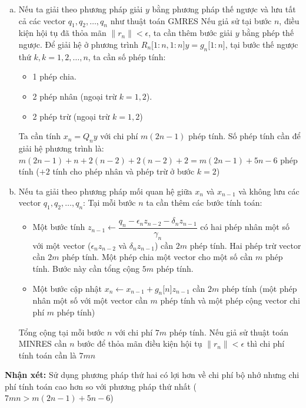 \documentclass[14pt, a4paper]{article}
\numberwithin{equation}{section}
\numberwithin{algorithm}{section}
\numberwithin{figure}{section}
\numberwithin{dl}{section}
\numberwithin{md}{section}
\numberwithin{bd}{section}
\numberwithin{dn}{section}
\begin{document}
\begin{enumerate}[a)] %
    \item Nếu ta giải theo phương pháp giải $y$ bằng phương pháp thế ngược và lưu tất cả các vector $q_1, q_2, \dots, q_n$ như thuật toán GMRES
    Nếu giả sử tại bước $n$, điều kiện hội tụ đã thỏa mãn $\lVert r_n \rVert < \epsilon$, ta cần thêm bước giải $y$ bằng phép thế ngược. Để giải hệ ở phương trình $R_n \lbrack 1:n, 1:n \rbrack y = g_n \lbrack 1:n \rbrack$, tại bước thế ngược thứ $k, k=1,2,\dots,n$, ta cần số phép tính:
    \begin{itemize}
        \item 1 phép chia.
        \item 2 phép nhân (ngoại trừ $k=1,2$).
        \item 2 phép trừ (ngoại trừ $k=1,2$)
    \end{itemize}
    Ta cần tính $x_n = Q_n y$ với chi phí $m(2n-1)$ phép tính.
    Số phép tính cần để giải hệ phương trình là: $m(2n-1) + n + 2(n-2) + 2(n-2) + 2=m(2n-1) + 5n-6$ phép tính ($+2$ tính cho phép nhân và phép trừ ở bước $k=2$)
    \item Nếu ta giải theo phương pháp mối quan hệ giữa $x_n$ và $x_{n-1}$ và không lưu các vector $q_1, q_2, \dots, q_n$:
    Tại mỗi bước $n$ ta cần thêm các bước tính toán:
    \begin{itemize}
        \item Một bước tính $z_{n-1} \leftarrow \dfrac{q_n - \epsilon_n z_{n-2} - \delta_n z_{n-1}}{\gamma_n}$ có hai phép nhân một số với một vector ($\epsilon_n z_{n-2}$ và $\delta_n z_{n-1}$) cần $2m$ phép tính. Hai phép trừ vector cần $2m$ phép tính. Một phép chia một vector cho một số cần $m$ phép tính. Bước này cần tổng cộng $5m$ phép tính.
        \item Một bước cập nhật $x_n \leftarrow x_{n-1} + g_n \lbrack n \rbrack z_{n-1}$ cần $2m$ phép tính (một phép nhân một số với một vector cần $m$ phép tính và một phép cộng vector chi phí $m$ phép tính)
    \end{itemize}
    Tổng cộng tại mỗi bước $n$ với chi phí $7m$ phép tính. Nếu giả sử thuật toán MINRES cần $n$ bước để thỏa mãn điều kiện hội tụ $\lVert r_n \rVert < \epsilon$ thì chi phí tính toán cần là $7mn$
\end{enumerate}

\textbf{Nhận xét:} Sử dụng phương pháp thứ hai có lợi hơn về chi phí bộ nhớ nhưng chi phí tính toán cao hơn so với phương pháp thứ nhất ($7mn > m(2n-1) + 5n - 6$)
\end{document}
